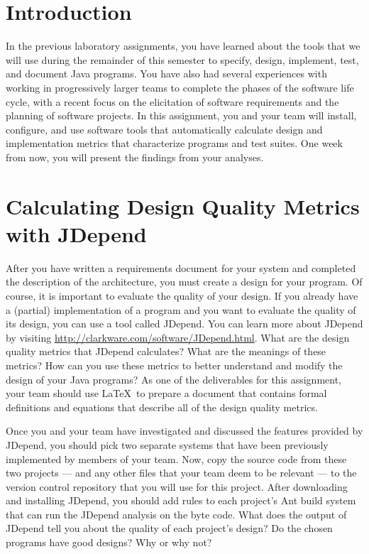 

\usepackage[compact]{titlesec}



\section*{Introduction}

In the previous laboratory assignments, you have learned about the tools that we will use during the remainder of this
semester to specify, design, implement, test, and document Java programs.  You have also had several experiences with
working in progressively larger teams to complete the phases of the software life cycle, with a recent focus on the
elicitation of software requirements and the planning of software projects.  In this assignment, you and your team will
install, configure, and use software tools that automatically calculate design and implementation metrics that
characterize programs and test suites.  One week from now, you will present the findings from your analyses.  

\section*{Calculating Design Quality Metrics with JDepend}

After you have written a requirements document for your system and completed the description of the architecture, you
must create a design for your program.  Of course, it is important to evaluate the quality of your design.  If you
already have a (partial) implementation of a program and you want to evaluate the quality of its design, you can use a tool
called JDepend.  You can learn more about JDepend by visiting \url{http://clarkware.com/software/JDepend.html}. What are
the design quality metrics that JDepend calculates? What are the meanings of these metrics? How can you use these
metrics to better understand and modify the design of your Java programs? As one of the deliverables for this
assignment, your team should use \LaTeX\ to prepare a document that contains formal definitions and equations that
describe all of the design quality metrics. 

Once you and your team have investigated and discussed the features provided by JDepend, you should pick two separate
systems that have been previously implemented by members of your team. Now, copy the source code from these two projects
--- and any other files that your team deem to be relevant --- to the version control repository that you will use for
this project.  After downloading and installing JDepend, you should add rules to each project's Ant build system that
can run the JDepend analysis on the byte code. What does the output of JDepend tell you about the quality of each
project's design? Do the chosen programs have good designs? Why or why not?

